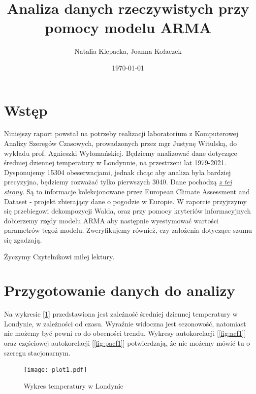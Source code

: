\documentclass{article}
\title{Analiza danych rzeczywistych przy pomocy modelu ARMA}
\author{Natalia Klepacka, Joanna Kołaczek}
\date{\today}
\theoremstyle{break}
\begin{document}
	\maketitle
	\tableofcontents
	\clearpage
	\section{Wstęp}
	Niniejszy raport powstał na potrzeby realizacji laboratorium z Komputerowej Analizy Szeregów Czasowych, prowadzonych przez mgr Justynę Witulską, do wykładu prof. Agnieszki Wyłomańskiej.
	Będziemy analizować dane dotyczące średniej dziennej temperatury w Londynnie, na przestrzeni lat 1979-2021. Dysponujemy 15304 obeserwacjami, jednak chcąc aby analiza była bardziej precyzyjna, będziemy rozważać tylko pierwszych 3040. Dane pochodzą \href{https://www.kaggle.com/datasets/emmanuelfwerr/london-weather-data }{\textit{z tej strony}}. Są to informacje kolekcjonowane przez European Climate Assessment and Dataset - projekt zbierający dane o pogodzie w Europie.
	W raporcie przyjrzymy się przebiegowi dekompozycji Walda, oraz przy pomocy kryteriów informacyjnych dobierzemy rzędy modelu ARMA aby następnie wyestymować wartości parametrów tegoż modelu. Zweryfikujemy również, czy założenia dotyczące szumu się zgadzają.

Życzymy Czytelnikowi miłej lektury.

\section{Przygotowanie danych do analizy}

Na wykresie [\ref{fig:p1}] przedstawiona jest zależność średniej dziennej temperatury w Londynie, w zależności od czasu. Wyraźnie widoczna jest sezonowość, natomiast nie możemy być pewni co do obecności trendu. Wykresy autokorelacji [\ref{fig:acf1}] oraz częściowej autokorelacji [\ref{fig:pacf1}] potwierdzają, że nie możemy mówić tu o szeregu stacjonarnym.

\begin{figure}[H]
	\begin{center}
		\texttt{[image: plot1.pdf]}
		\caption{Wykres temperatury w Londynie}
		\label{fig:p1}
	\end{center}
\end{figure}
\end{document}
